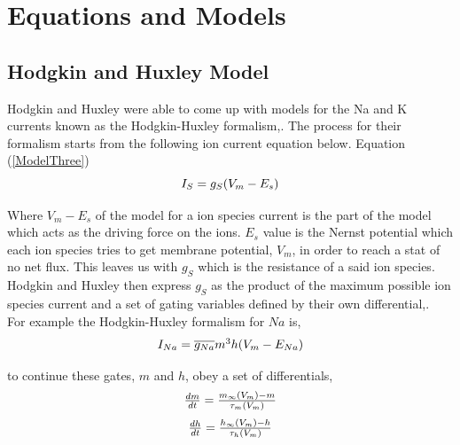 \documentclass{bmcart}%
\begin{document}
\section*{Equations and Models}

\subsection*{Hodgkin and Huxley Model}

Hodgkin and Huxley were able to come up with models for the Na and K currents known as the Hodgkin-Huxley formalism,\cite{Sneyd2016}. The process for their formalism starts from the following ion current equation below. Equation (\ref{ModelThree})
\begin{equation}
\\
$$
    I_S = g_S (V_m - E_s)
$$
\label{ModelThree}
\end{equation}

Where \begin{math} V_m - E_s \end {math} of the model for a ion species current is the part of the model which acts as the driving force on the ions. $E_s$ value is the Nernst potential which each ion species tries to get membrane potential, $V_m$, in order to reach a stat of no net flux. This leaves us with \begin{math} g_S \end{math} which is the resistance of a said ion species. Hodgkin and Huxley then express \begin{math} g_S \end{math} as the product of the maximum possible ion species current and a set of gating variables defined by their own differential,\cite{Sneyd2016}.\\
For example the Hodgkin-Huxley formalism for \begin{math}  Na \end{math} is,
\begin{equation}
\\
$$
    I_{Na} = \overline{g_{Na}} m^3 h (V_m - E_{Na})
$$
\label{NaForm}
\end{equation}

to continue these gates, $m$ and $h$, obey a set of differentials,
\begin{equation}
\\
$$
    \frac {d m}{d t} =  \frac {m_{\infty} (V_m) - m}{\tau_m (V_m)}
$$
\label{changeM}
\end{equation}
\begin{equation}
\\
$$
   \frac {d h}{d t} =  \frac {h_{\infty} (V_m) - h}{\tau_h (V_m)}  
$$
\label{changeH}
\end{equation}
\end{document}
